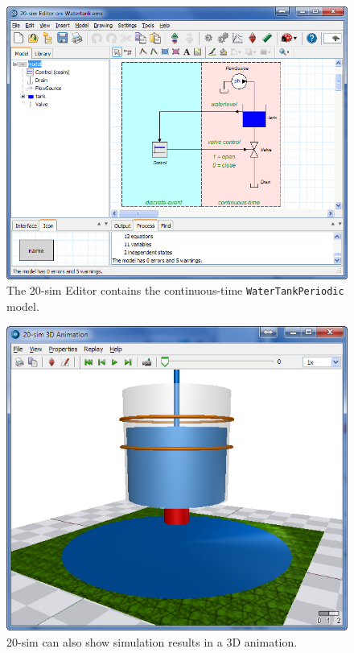 \documentclass{crescendorepchap}
\begin{document}
\begin{figure}[htbp]
\centering
\includegraphics[width=.9\textwidth]{images/20simEditorWaterTank.png}
\caption{The 20-sim Editor contains the continuous-time \texttt{WaterTankPeriodic} model.\label{fig:watertankeditor}}
\end{figure}

\begin{figure}[htbp]
\centering
\includegraphics[width=.9\textwidth]{images/20simAnimationWaterTank.png}
\caption{20-sim can also show simulation results in a 3D animation.\label{fig:water3Dani}}
\end{figure}
\end{document}
